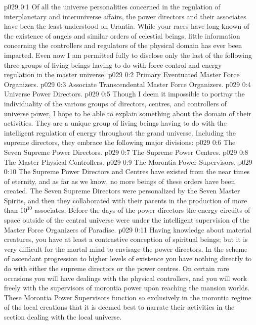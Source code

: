 \author{Universal Censor}
\vs p029 0:1 Of all the universe personalities concerned in the regulation of interplanetary and interuniverse affairs, the power directors and their associates have been the least understood on Urantia. While your races have long known of the existence of angels and similar orders of celestial beings, little information concerning the controllers and regulators of the physical domain has ever been imparted. Even now I am permitted fully to disclose only the last of the following three groups of living beings having to do with force control and energy regulation in the master universe:
\vs p029 0:2 \bibnobreakspace Primary Eventuated Master Force Organizers.
\vs p029 0:3 \bibnobreakspace Associate Transcendental Master Force Organizers.
\vs p029 0:4 \bibnobreakspace Universe Power Directors.
\vs p029 0:5 \pc Though I deem it impossible to portray the individuality of the various groups of directors, centres, and controllers of universe power, I hope to be able to explain something about the domain of their activities. They are a unique group of living beings having to do with the intelligent regulation of energy throughout the grand universe. Including the supreme directors, they embrace the following major divisions:
\vs p029 0:6 \bibnobreakspace The Seven Supreme Power Directors.
\vs p029 0:7 \bibnobreakspace The Supreme Power Centres.
\vs p029 0:8 \bibnobreakspace The Master Physical Controllers.
\vs p029 0:9 \bibnobreakspace The Morontia Power Supervisors.
\vs p029 0:10 \pc The Supreme Power Directors and Centres have existed from the near times of eternity, and as far as we know, no more beings of these orders have been created. The Seven Supreme Directors were personalized by the Seven Master Spirits, and then they collaborated with their parents in the production of more than $10^{10}$ associates. Before the days of the power directors the energy circuits of space outside of the central universe were under the intelligent supervision of the Master Force Organizers of Paradise.
\vs p029 0:11 Having knowledge about material creatures, you have at least a contrastive conception of spiritual beings; but it is very difficult for the mortal mind to envisage the power directors. In the scheme of ascendant progression to higher levels of existence you have nothing directly to do with either the supreme directors or the power centres. On certain rare occasions you will have dealings with the physical controllers, and you will work freely with the supervisors of morontia power upon reaching the mansion worlds. These Morontia Power Supervisors function so exclusively in the morontia regime of the local creations that it is deemed best to narrate their activities in the section dealing with the local universe.

